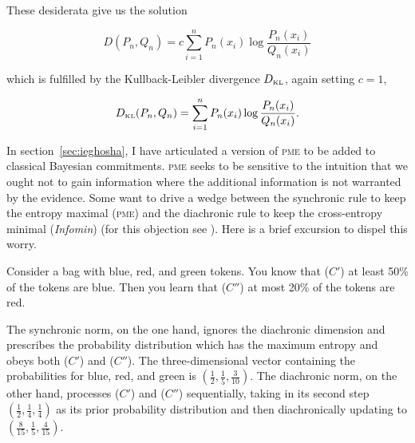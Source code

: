 \documentclass[phd,12pt,oneside]{ubcthesis}
\begin{document}
{\noindent}These desiderata give us the solution

\begin{equation}
  \label{eq:enuamich}
  D(P_{n},Q_{n})=c\sum_{i=1}^{n}P_{n}(x_{i})\log\frac{P_{n}(x_{i})}{Q_{n}(x_{i})}
\end{equation}

{\noindent}which is fulfilled by the Kullback-Leibler divergence $D_{\mbox{\tiny
    KL}}$, again setting $c=1$,

\begin{equation}
  \label{eq:xaingouw}
  D_{\mbox{\tiny KL}}(P_{n},Q_{n})=\sum_{i=1}^{n}P_{n}(x_{i})\log\frac{P_{n}(x_{i})}{Q_{n}(x_{i})}.
\end{equation}

In section~\ref{sec:ieghosha}, I have articulated a version of
\textsc{pme} to be added to classical Bayesian commitments.
\textsc{pme} seeks to be sensitive to the intuition that we ought not
to gain information where the additional information is not warranted
by the evidence. Some want to drive a wedge between the synchronic
rule to keep the entropy maximal (\textsc{pme}) and the diachronic
rule to keep the cross-entropy minimal (\emph{Infomin}) (for this
objection see ). Here is a brief excursion to
dispel this worry.

\begin{quotex}
  \label{ex:piecemeal} Consider a bag
  with blue, red, and green tokens. You know that ($C'$) at least 50\%
  of the tokens are blue. Then you learn that ($C''$) at most 20\% of
  the tokens are red.
\end{quotex}

The synchronic norm, on the one hand, ignores the diachronic dimension
and prescribes the probability distribution which has the maximum
entropy and obeys both ($C'$) and ($C''$). The three-dimensional
vector containing the probabilities for blue, red, and green is
$(\frac{1}{2},\frac{1}{5},\frac{3}{10})$. The diachronic norm, on the
other hand, processes ($C'$) and ($C''$) sequentially, taking in its
second step $(\frac{1}{2},\frac{1}{4},\frac{1}{4})$ as its prior
probability distribution and then diachronically updating to
$(\frac{8}{15},\frac{1}{5},\frac{4}{15})$.
\end{document}

